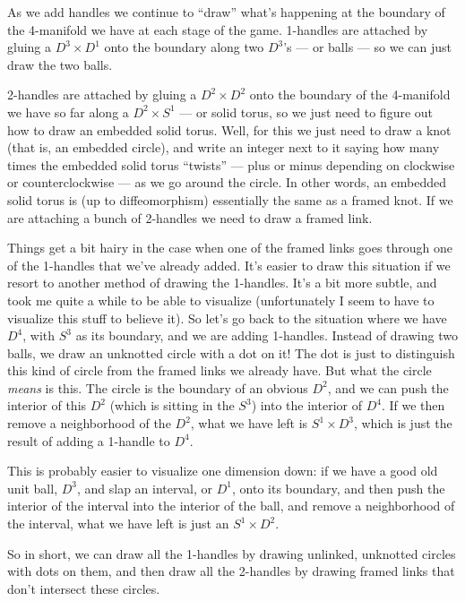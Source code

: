 \documentclass{article}
\begin{document}
As we add handles we continue to ``draw'' what's happening at the
boundary of the 4-manifold we have at each stage of the game. 1-handles
are attached by gluing a \(D^3 \times D^1\) onto the boundary along two
\(D^3\)'s --- or balls --- so we can just draw the two balls.

2-handles are attached by gluing a \(D^2 \times D^2\) onto the boundary
of the 4-manifold we have so far along a \(D^2 \times S^1\) --- or solid
torus, so we just need to figure out how to draw an embedded solid
torus. Well, for this we just need to draw a knot (that is, an embedded
circle), and write an integer next to it saying how many times the
embedded solid torus ``twists'' --- plus or minus depending on clockwise
or counterclockwise --- as we go around the circle. In other words, an
embedded solid torus is (up to diffeomorphism) essentially the same as a
framed knot. If we are attaching a bunch of 2-handles we need to draw a
framed link.

Things get a bit hairy in the case when one of the framed links goes
through one of the 1-handles that we've already added. It's easier to
draw this situation if we resort to another method of drawing the
1-handles. It's a bit more subtle, and took me quite a while to be able
to visualize (unfortunately I seem to have to visualize this stuff to
believe it). So let's go back to the situation where we have \(D^4\),
with \(S^3\) as its boundary, and we are adding 1-handles. Instead of
drawing two balls, we draw an unknotted circle with a dot on it! The dot
is just to distinguish this kind of circle from the framed links we
already have. But what the circle \emph{means} is this. The circle is
the boundary of an obvious \(D^2\), and we can push the interior of this
\(D^2\) (which is sitting in the \(S^3\)) into the interior of \(D^4\).
If we then remove a neighborhood of the \(D^2\), what we have left is
\(S^1 \times D^3\), which is just the result of adding a 1-handle to
\(D^4\).

This is probably easier to visualize one dimension down: if we have a
good old unit ball, \(D^3\), and slap an interval, or \(D^1\), onto its
boundary, and then push the interior of the interval into the interior
of the ball, and remove a neighborhood of the interval, what we have
left is just an \(S^1 \times D^2\).

So in short, we can draw all the 1-handles by drawing unlinked,
unknotted circles with dots on them, and then draw all the 2-handles by
drawing framed links that don't intersect these circles.
\end{document}
